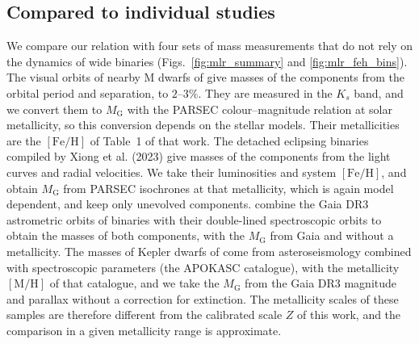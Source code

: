 \documentclass{aa}
\begin{document}
\subsection{Compared to individual studies}
We compare our relation with four sets of mass measurements that do not rely on the dynamics of wide binaries (Figs.~\ref{fig:mlr_summary} and \ref{fig:mlr_feh_bins}). The visual orbits of nearby M dwarfs of \citet{Mann2019} give masses of the components from the orbital period and separation, to $2$--$3\%$. They are measured in the $K_s$ band, and we convert them to $M_{\mathrm{G}}$ with the PARSEC colour--magnitude relation at solar metallicity, so this conversion depends on the stellar models. Their metallicities are the $[\mathrm{Fe/H}]$ of Table~1 of that work. The detached eclipsing binaries compiled by Xiong et al. (2023) give masses of the components from the light curves and radial velocities. We take their luminosities and system $[\mathrm{Fe/H}]$, and obtain $M_{\mathrm{G}}$ from PARSEC isochrones at that metallicity, which is again model dependent, and keep only unevolved components. \citet{Chevalier2023} combine the Gaia DR3 astrometric orbits of binaries with their double-lined spectroscopic orbits to obtain the masses of both components, with the $M_{\mathrm{G}}$ from Gaia and without a metallicity. The masses of Kepler dwarfs of \citet{Serenelli2017} come from asteroseismology combined with spectroscopic parameters (the APOKASC catalogue), with the metallicity $[\mathrm{M/H}]$ of that catalogue, and we take the $M_{\mathrm{G}}$ from the Gaia DR3 magnitude and parallax without a correction for extinction. The metallicity scales of these samples are therefore different from the calibrated scale $Z$ of this work, and the comparison in a given metallicity range is approximate.
\end{document}
